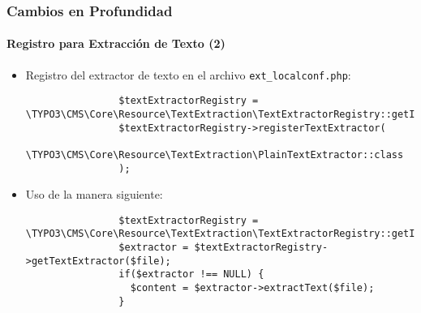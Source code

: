 \begin{frame}[fragile]
	\frametitle{Cambios en Profundidad}
	\framesubtitle{Registro para Extracción de Texto (2)}

	\lstset{basicstyle=\tiny\ttfamily}

	\begin{itemize}

		\item Registro del extractor de texto en el archivo \texttt{ext\_localconf.php}:

			\begin{lstlisting}
				$textExtractorRegistry = \TYPO3\CMS\Core\Resource\TextExtraction\TextExtractorRegistry::getInstance();
				$textExtractorRegistry->registerTextExtractor(
				  \TYPO3\CMS\Core\Resource\TextExtraction\PlainTextExtractor::class
				);
			\end{lstlisting}

		\item Uso de la manera siguiente:

			\begin{lstlisting}
				$textExtractorRegistry = \TYPO3\CMS\Core\Resource\TextExtraction\TextExtractorRegistry::getInstance();
				$extractor = $textExtractorRegistry->getTextExtractor($file);
				if($extractor !== NULL) {
				  $content = $extractor->extractText($file);
				}
			\end{lstlisting}
	\end{itemize}

\end{frame}


